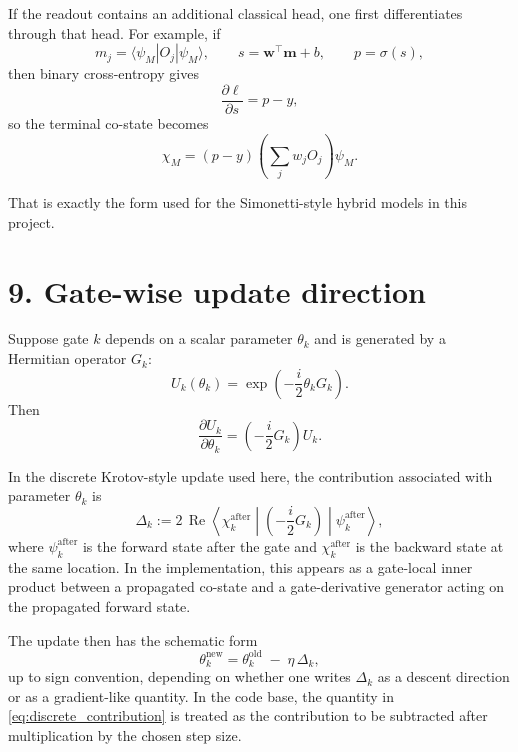 \documentclass[11pt]{article}
\begin{document}
If the readout contains an additional classical head, one first differentiates through that head. For example, if
\begin{equation}
m_j = \langle \psi_M | O_j | \psi_M \rangle,
\qquad
s = \bm{w}^\top \bm{m} + b,
\qquad
p=\sigma(s),
\end{equation}
then binary cross-entropy gives
\begin{equation}
\frac{\partial \ell}{\partial s}=p-y,
\end{equation}
so the terminal co-state becomes
\begin{equation}
\chi_M
=
(p-y)
\left(
\sum_j w_j O_j
\right)\psi_M.
\label{eq:terminal_costate_hybrid_head}
\end{equation}

That is exactly the form used for the Simonetti-style hybrid models in this project.

\section*{9. Gate-wise update direction}
Suppose gate $k$ depends on a scalar parameter $\theta_k$ and is generated by a Hermitian operator $G_k$:
\begin{equation}
U_k(\theta_k)=\exp\!\left(-\frac{i}{2}\theta_k G_k\right).
\end{equation}
Then
\begin{equation}
\frac{\partial U_k}{\partial \theta_k}
=
\left(-\frac{i}{2}G_k\right)U_k.
\end{equation}

In the discrete Krotov-style update used here, the contribution associated with parameter $\theta_k$ is
\begin{equation}
\Delta_k
:=
2\,\operatorname{Re}
\left\langle
\chi_k^{\text{after}}
\middle|
\left(-\frac{i}{2}G_k\right)
\middle|
\psi_k^{\text{after}}
\right\rangle ,
\label{eq:discrete_contribution}
\end{equation}
where $\psi_k^{\text{after}}$ is the forward state after the gate and $\chi_k^{\text{after}}$ is the backward state at the same location. In the implementation, this appears as a gate-local inner product between a propagated co-state and a gate-derivative generator acting on the propagated forward state.

The update then has the schematic form
\begin{equation}
\theta_k^{\text{new}}
=
\theta_k^{\text{old}}
\;-\;
\eta \, \Delta_k,
\end{equation}
up to sign convention, depending on whether one writes $\Delta_k$ as a descent direction or as a gradient-like quantity. In the code base, the quantity in \eqref{eq:discrete_contribution} is treated as the contribution to be subtracted after multiplication by the chosen step size.
\end{document}
